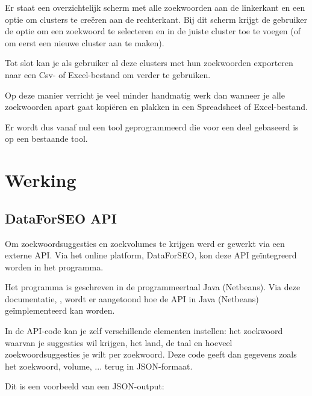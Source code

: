 Er staat een overzichtelijk scherm met alle zoekwoorden aan de linkerkant en een optie om clusters te creëren aan de rechterkant. Bij dit scherm krijgt de gebruiker de optie om een zoekwoord te selecteren en in de juiste cluster toe te voegen (of om eerst een nieuwe cluster aan te maken). 

Tot slot kan je als gebruiker al deze clusters met hun zoekwoorden exporteren naar een Csv- of Excel-bestand om verder te gebruiken. 

Op deze manier verricht je veel minder handmatig werk dan wanneer je alle zoekwoorden apart gaat kopiëren en plakken in een Spreadsheet of Excel-bestand. 

Er wordt dus vanaf nul een tool geprogrammeerd die voor een deel gebaseerd is op een bestaande tool. 

\section{Werking}
\label{ch: Werking}

\subsection{DataForSEO API}
\label{ch: DataForSEO API}

Om zoekwoordsuggesties en zoekvolumes te krijgen werd er gewerkt via een externe API. Via het online platform, DataForSEO, kon deze API geïntegreerd worden in het programma. 

Het programma is geschreven in de programmeertaal Java (Netbeans). Via deze documentatie, \textcite{DATAFORSEO}, wordt er aangetoond hoe de API in Java (Netbeans) geïmplementeerd kan worden. 

In de API-code kan je zelf verschillende elementen instellen: het zoekwoord waarvan je suggesties wil krijgen, het land, de taal en hoeveel zoekwoordsuggesties je wilt per zoekwoord. Deze code geeft dan gegevens zoals het zoekwoord, volume, ... terug in JSON-formaat. 

Dit is een voorbeeld van een JSON-output: 

